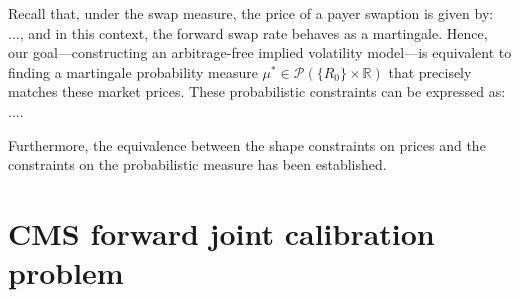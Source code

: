 Recall that, under the swap measure, the price of a payer swaption is given by: ..., and in this context, 
the forward swap rate behaves as a martingale. Hence, our goal—constructing an arbitrage-free implied volatility 
model—is equivalent to finding a martingale probability measure 
\(\mu^{*} \in \mathcal{P}(\{R_{0}\} \times \mathbb{R})\) that precisely matches these market prices. 
These probabilistic constraints can be expressed as: $...$. 

Furthermore, the equivalence between the shape constraints on prices and the constraints on the 
probabilistic measure has been established.
 



\section{CMS forward joint calibration problem}

